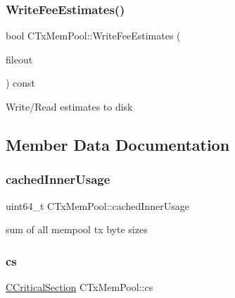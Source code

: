 \mbox{\label{class_c_tx_mem_pool_a251f595b6527be005634574ce5d01f70}} 
\subsubsection{\texorpdfstring{Write\+Fee\+Estimates()}{WriteFeeEstimates()}}
{\footnotesize\ttfamily bool C\+Tx\+Mem\+Pool\+::\+Write\+Fee\+Estimates (\begin{DoxyParamCaption}\item[{\mbox{\hyperlink{class_c_auto_file}{C\+Auto\+File}} \&}]{fileout }\end{DoxyParamCaption}) const}

Write/\+Read estimates to disk 

\subsection{Member Data Documentation}
\mbox{\label{class_c_tx_mem_pool_a9cf8ed535f89c0a1332af6c15e4a2aa9}} 
\subsubsection{\texorpdfstring{cached\+Inner\+Usage}{cachedInnerUsage}}
{\footnotesize\ttfamily uint64\+\_\+t C\+Tx\+Mem\+Pool\+::cached\+Inner\+Usage\hspace{0.3cm}{\ttfamily [private]}}



sum of all mempool tx\textquotesingle{} byte sizes 

\mbox{\label{class_c_tx_mem_pool_ac7ee8c06837c7d2688e2d7e3d071bdbb}} 
\subsubsection{\texorpdfstring{cs}{cs}}
{\footnotesize\ttfamily \mbox{\hyperlink{sync_8h_a37a4692b2d517f2843655ca11af7668a}{C\+Critical\+Section}} C\+Tx\+Mem\+Pool\+::cs\hspace{0.3cm}{\ttfamily [mutable]}}



